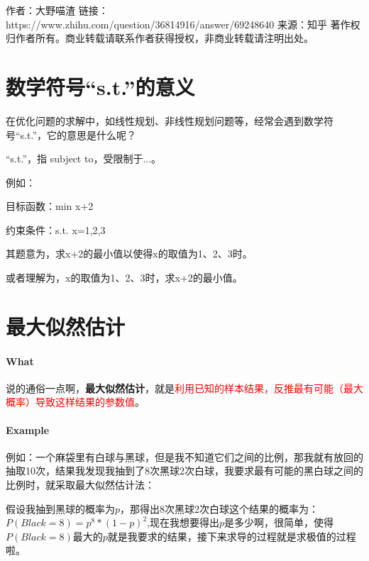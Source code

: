 \documentclass[UTF8]{ctexbook}
\begin{document}
作者：大野喵渣
链接：https://www.zhihu.com/question/36814916/answer/69248640
来源：知乎
著作权归作者所有。商业转载请联系作者获得授权，非商业转载请注明出处。

\section{数学符号“s.t.”的意义}

在优化问题的求解中，如线性规划、非线性规划问题等，经常会遇到数学符号“s.t.”，它的意思是什么呢？

“s.t.”，指 subject to，受限制于...。

例如：

                目标函数：min {x+2}

                约束条件：s.t.  x={1,2,3}

其题意为，求x+2的最小值以使得x的取值为1、2、3时。

或者理解为，x的取值为1、2、3时，求x+2的最小值。

\section{最大似然估计}

\paragraph{What}
说的通俗一点啊，\textbf{最大似然估计}，就是\textcolor{red}{利用已知的样本结果，反推最有可能（最大概率）导致这样结果的参数值}。

\paragraph{Example}
例如：一个麻袋里有白球与黑球，但是我不知道它们之间的比例，那我就有放回的抽取10次，结果我发现我抽到了8次黑球2次白球，我要求最有可能的黑白球之间的比例时，就采取最大似然估计法：

假设我抽到黑球的概率为$p$，那得出8次黑球2次白球这个结果的概率为：
$P(Black=8)=p^{8}*(1-p)^{2}$,现在我想要得出$p$是多少啊，很简单，使得$P(Black=8)$最大的$p$就是我要求的结果，接下来求导的过程就是求极值的过程啦。

\end{document}
